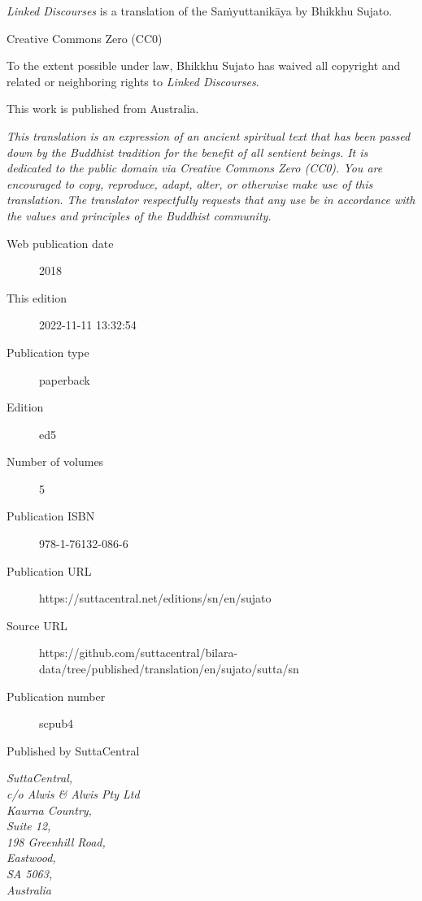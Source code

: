 \documentclass[12pt,openany]{book}%
\begin{document}
\begin{footnotesize}

\textit{Linked Discourses} is a translation of the Saṁyuttanikāya by Bhikkhu Sujato.

\medskip

Creative Commons Zero (CC0)

To the extent possible under law, Bhikkhu Sujato has waived all copyright and related or neighboring rights to \textit{Linked Discourses}.

\medskip

This work is published from Australia.

\begin{center}
\textit{This translation is an expression of an ancient spiritual text that has been passed down by the Buddhist tradition for the benefit of all sentient beings. It is dedicated to the public domain via Creative Commons Zero (CC0). You are encouraged to copy, reproduce, adapt, alter, or otherwise make use of this translation. The translator respectfully requests that any use be in accordance with the values and principles of the Buddhist community.}
\end{center}

\medskip

\begin{description}
    \item[Web publication date] 2018
    \item[This edition] 2022-11-11 13:32:54
    \item[Publication type] paperback
    \item[Edition] ed5
    \item[Number of volumes] 5
    \item[Publication ISBN] 978-1-76132-086-6
    \item[Publication URL] https://suttacentral.net/editions/sn/en/sujato
    \item[Source URL] https://github.com/suttacentral/bilara-data/tree/published/translation/en/sujato/sutta/sn
    \item[Publication number] scpub4
\end{description}

\medskip

Published by SuttaCentral

\medskip

\textit{SuttaCentral,\\
c/o Alwis \& Alwis Pty Ltd\\
Kaurna Country,\\
Suite 12,\\
198 Greenhill Road,\\
Eastwood,\\
SA 5063,\\
Australia}

\end{footnotesize}
\end{document}
